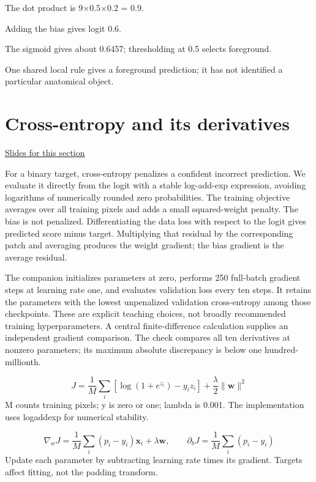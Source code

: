 \documentclass[11pt,letterpaper]{article}
\theoremstyle{definition}\newtheorem{definition}{Definition}\newtheorem{example}{Example}
\numberwithin{equation}{section}
\begin{document}
The dot product is 9\ensuremath{\times}0.5\ensuremath{\times}0.2 = 0.9.

Adding the bias gives logit 0.6.

The sigmoid gives about 0.6457; thresholding at 0.5 selects foreground.

One shared local rule gives a foreground prediction; it has not identified a particular anatomical object.
\section{Cross-entropy and its derivatives}
\hypertarget{note-cross-entropy-and-its-derivatives}{}\label{note:cross-entropy-and-its-derivatives}
{\small \href{slides.html\#frame=binary-cross-entropy-from-logits\&step=1}{Slides for this section}}\par
For a binary target, cross-entropy penalizes a confident incorrect prediction. We evaluate it directly from the logit with a stable log-add-exp expression, avoiding logarithms of numerically rounded zero probabilities. The training objective averages over all training pixels and adds a small squared-weight penalty. The bias is not penalized. Differentiating the data loss with respect to the logit gives predicted score minus target. Multiplying that residual by the corresponding patch and averaging produces the weight gradient; the bias gradient is the average residual.

The companion initializes parameters at zero, performs 250 full-batch gradient steps at learning rate one, and evaluates validation loss every ten steps. It retains the parameters with the lowest unpenalized validation cross-entropy among those checkpoints. These are explicit teaching choices, not broadly recommended training hyperparameters. A central finite-difference calculation supplies an independent gradient comparison. The check compares all ten derivatives at nonzero parameters; its maximum absolute discrepancy is below one hundred-millionth.

\[
J=\frac{1}{M}\sum_i\left[\log(1+e^{z_i})-y_i z_i\right]+\frac{\lambda}{2}\|\mathbf{w}\|^2
\]
M counts training pixels; y is zero or one; lambda is 0.001. The implementation uses logaddexp for numerical stability.

\[
\nabla_w J=\frac1M\sum_i(p_i-y_i)\mathbf{x}_i+\lambda\mathbf{w},\qquad \partial_bJ=\frac1M\sum_i(p_i-y_i)
\]
Update each parameter by subtracting learning rate times its gradient. Targets affect fitting, not the padding transform.
\end{document}
